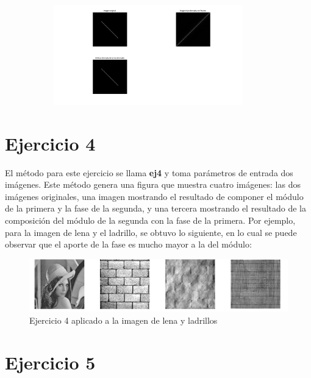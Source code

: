 \documentclass{article}
\begin{document}
\begin{figure}[H]
\begin{subfigure}{0.5\textwidth}
    \end{subfigure}\hfill
    \begin{subfigure}{0.5\textwidth}
        \includegraphics[width=0.9\textwidth]{ej3-otro3.png}
    \end{subfigure}
\end{figure}

\section*{Ejercicio 4}

El método para este ejercicio se llama \textbf{ej4} y toma parámetros de entrada dos imágenes. Este método genera una figura que muestra cuatro imágenes: las dos imágenes originales, una imagen mostrando el resultado de componer el módulo de la primera y la fase de la segunda, y una tercera mostrando el resultado de la composición del módulo de la segunda con la fase de la primera. Por ejemplo, para la imagen de lena y el ladrillo, se obtuvo lo siguiente, en lo cual se puede observar que el aporte de la fase es mucho mayor a la del módulo:

\begin{figure}[H]
\centering
    \includegraphics[width=1\textwidth]{ej4.png}
    \caption{Ejercicio 4 aplicado a la imagen de lena y ladrillos}
\end{figure}

\section*{Ejercicio 5}
\end{document}
